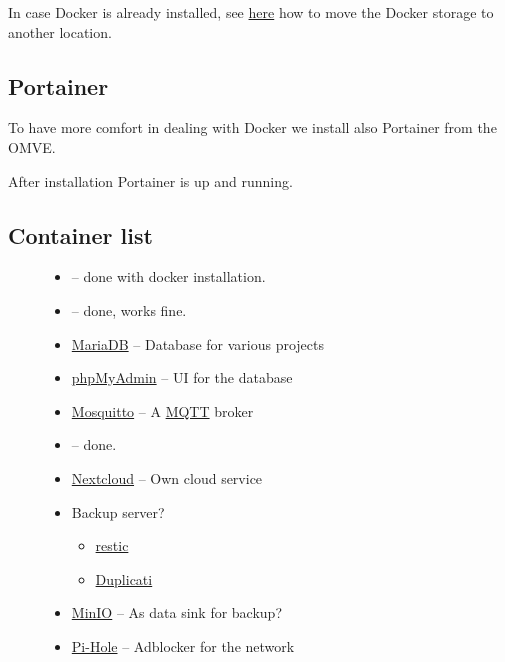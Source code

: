 In case \gls{Docker} is already installed, see \href{https://www.reddit.com/r/OpenMediaVault/comments/fl40gf/moving_docker_storage/}{here}
how to move the \gls{Docker} storage to another location.

\subsection{Portainer}

To have more comfort in dealing with \gls{Docker} we install also \gls{Portainer}
from the \gls{OMVE}.


After installation \gls{Portainer} is up and running.


\subsection{Container list}

\begin{figure}[H]
    \begin{itemize}
        \item {} --
              done with docker installation.
        \item {} --
              done, works fine.
        \item \href{https://mariadb.org/}{MariaDB} -- Database for various projects
        \item \href{https://www.phpmyadmin.net/}{phpMyAdmin} -- UI for the database
        \item \href{https://mosquitto.org/}{Mosquitto} -- A \href{https://mqtt.org/}{MQTT} broker
        \item {} --
              done.
        \item \href{https://nextcloud.com/}{Nextcloud} -- Own cloud service
        \item Backup server?
              \begin{itemize}
                  \item \href{https://restic.net/}{restic}
                  \item \href{https://www.duplicati.com/}{Duplicati}
              \end{itemize}
        \item \href{https://docs.min.io/}{MinIO} -- As data sink for backup?
        \item \href{https://pi-hole.net/}{Pi-Hole} -- Adblocker for the network
    \end{itemize}
\end{figure}

